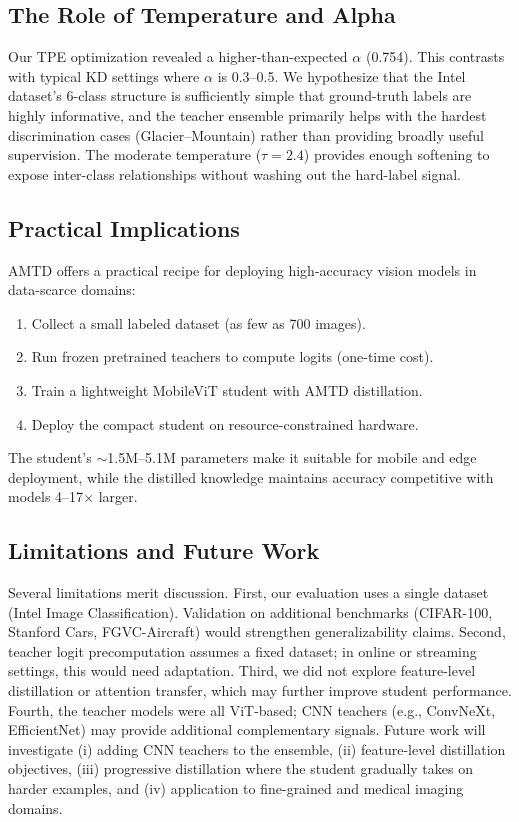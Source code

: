 \documentclass[journal]{IEEEtran}
\begin{document}
\subsection{The Role of Temperature and Alpha}

Our TPE optimization revealed a higher-than-expected $\alpha$ (0.754). This contrasts with
typical KD settings where $\alpha$ is 0.3--0.5. We hypothesize that the Intel dataset's
6-class structure is sufficiently simple that ground-truth labels are highly informative,
and the teacher ensemble primarily helps with the hardest discrimination cases
(Glacier--Mountain) rather than providing broadly useful supervision. The moderate temperature
($\tau=2.4$) provides enough softening to expose inter-class relationships without washing
out the hard-label signal.

\subsection{Practical Implications}

AMTD offers a practical recipe for deploying high-accuracy vision models in data-scarce
domains:

\begin{enumerate}
    \item Collect a small labeled dataset (as few as 700 images).
    \item Run frozen pretrained teachers to compute logits (one-time cost).
    \item Train a lightweight MobileViT student with AMTD distillation.
    \item Deploy the compact student on resource-constrained hardware.
\end{enumerate}

The student's $\sim$1.5M--5.1M parameters make it suitable for mobile and edge deployment,
while the distilled knowledge maintains accuracy competitive with models 4--17$\times$
larger.

\subsection{Limitations and Future Work}

Several limitations merit discussion. First, our evaluation uses a single dataset (Intel
Image Classification). Validation on additional benchmarks (CIFAR-100, Stanford Cars,
FGVC-Aircraft) would strengthen generalizability claims. Second, teacher logit precomputation
assumes a fixed dataset; in online or streaming settings, this would need adaptation.
Third, we did not explore feature-level distillation or attention transfer, which may
further improve student performance. Fourth, the teacher models were all ViT-based; CNN
teachers (e.g., ConvNeXt, EfficientNet) may provide additional complementary signals.
Future work will investigate (i) adding CNN teachers to the ensemble, (ii) feature-level
distillation objectives, (iii) progressive distillation where the student gradually
takes on harder examples, and (iv) application to fine-grained and medical imaging domains.
\end{document}
